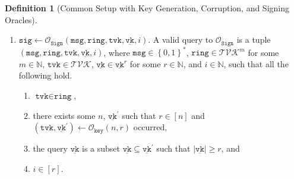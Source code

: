 \documentclass[11pt]{article}
\theoremstyle{definition}
\newtheorem{definition}[definition]{Definition}
\newcommand{\sk}{\texttt{sk}}
\newcommand{\vk}{\texttt{vk}}
\newcommand{\tvk}{\texttt{tvk}}
\newcommand{\ring}{\texttt{ring}}
\newcommand{\VK}{\underline{\texttt{vk}}}
\newcommand{\sig}{\texttt{sig}}
\newcommand{\bitstrings}{\left\{0,1\right\}^*}
\newcommand{\bbn}{\mathbb{N}}
\newcommand{\msg}{\texttt{msg}}
\newcommand{\sign}{\texttt{Sign}}
\newcommand{\corruptionOracle}{\mathcal{O}_{\texttt{corrupt}}}
\newcommand{\signingOracle}{\mathcal{O}_{\sign}}
\newcommand{\keyOracle}{\mathcal{O}_{\texttt{key}}}
\newcommand{\corruptedTotalKeys}{\mathcal{L}_{\texttt{corrupt}}^{\texttt{tot}}}
\newcommand{\corruptedKeyShareSet}{\mathcal{L}_{\texttt{corrupt}}^{\texttt{sh}}}
\newcommand{\lar}{\leftarrow}
\begin{document}
\begin{definition}[Common Setup with Key Generation, Corruption, and Signing Oracles]
\begin{enumerate}
\begin{enumerate}
Upon success, we say the verification key share $\vk_i$ has been corrupted, and if $r$ or more key shares have been corrupted associated with $\tvk$, then we say $\tvk$ has been totally corrupted. Let $\corruptedKeyShareSet = \left\{\vk_i \mid \sk_i \leftarrow \corruptionOracle(i, \tvk, \VK)\text{ occurred}\right\}$ be the set of corrupted key shares and let $\corruptedTotalKeys$ be the set of totally corrupted keys.



\begin{oracle}
    \centering
        \begin{tabular}{|l|}
        \hline
          {\textbf{Oracle} $\corruptionOracle(i, \tvk, \VK)$} \\
        \hline 
        \textbf{if} $(\tvk, \VK) \lar \keyOracle(n,r)$\textbf{ and }$i \in [n]$\textbf{ then } \\ 
        \quad \quad $\corruptedKeyShareSet = \corruptedKeyShareSet \cup \left\{\vk_i\right\}$ \\ 
        \quad \quad \textbf{if} $|\VK \cap \corruptedKeyShareSet| \geq r$  
        \textbf{then}\\
        \quad \quad \quad \quad $\corruptedTotalKeys \lar \corruptedTotalKeys \cup \left\{\tvk\right\}$ \\
        \quad \quad \textbf{return} $\sk_i$ \\
        \textbf{else return} $\perp$ \\
        
        \hline
        \end{tabular}
\caption{The corruption oracle in the game of common setup.}
\label{oracle:corrupt}
\end{oracle}




\item $\sig \leftarrow \signingOracle(\msg, \ring, \tvk, \VK, i).$ A valid query to $\signingOracle$ is a tuple $(\msg, \ring, \tvk, \VK, i)$, where $\msg \in \bitstrings$, $\ring \in \mathcal{TVK}^m$ for some $m \in \bbn$, $\tvk \in \mathcal{TVK}$, $\VK \in \VK^r$ for some $r \in \bbn$, and $i \in \bbn$, such that all the following hold.
\begin{enumerate}
\item $\tvk \in \ring$,
\item there exists some $n$, $\VK^\prime$ such that $r \in [n]$ and $(\tvk, \VK^\prime) \leftarrow \keyOracle(n,r)$ occurred,
\item the query $\VK$ is a subset $\VK \subseteq \VK^\prime$ such that $\left|\VK\right| \geq r$, and
\item $i \in [r]$.
\end{enumerate}


\end{enumerate}
\end{enumerate}
\end{definition}
\end{document}
